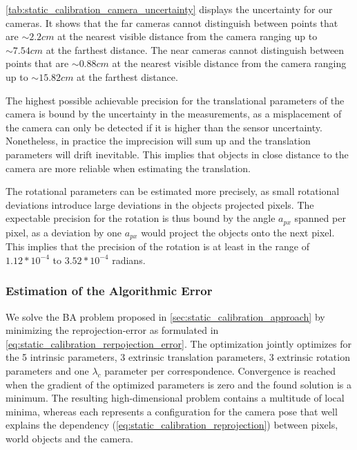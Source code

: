 \autoref{tab:static_calibration_camera_uncertainty} displays the uncertainty for our cameras.
It shows that the far cameras cannot distinguish between points that are $\sim 2.2 cm$ at the nearest visible distance from the camera ranging up to $\sim 7.54 cm$ at the farthest distance.
The near cameras cannot distinguish between points that are $\sim 0.88 cm$ at the nearest visible distance from the camera ranging up to $\sim 15.82 cm$ at the farthest distance.

The highest possible achievable precision for the translational parameters of the camera is bound by the uncertainty in the measurements, as a misplacement of the camera can only be detected if it is higher than the sensor uncertainty.
Nonetheless, in practice the imprecision will sum up and the translation parameters will drift inevitable. 
This implies that objects in close distance to the camera are more reliable when estimating the translation.

The rotational parameters can be estimated more precisely, as small rotational deviations introduce large deviations in the objects projected pixels.
The expectable precision for the rotation is thus bound by the angle $a_{px}$ spanned per pixel, as a deviation by one $a_{px}$ would project the objects onto the next pixel.
This implies that the precision of the rotation is at least in the range of $1.12 * 10^{-4}$ to $3.52 * 10^{-4}$ radians. 


\subsubsection{Estimation of the Algorithmic Error}
We solve the BA problem proposed in \autoref{sec:static_calibration_approach} by minimizing the reprojection-error as formulated in \autoref{eq:static_calibration_rerpojection_error}.
The optimization jointly optimizes for the 5 intrinsic parameters, 3 extrinsic translation parameters, 3 extrinsic rotation parameters and one $\lambda_c$ parameter per correspondence.
Convergence is reached when the gradient of the optimized parameters is zero and the found solution is a minimum.
The resulting high-dimensional problem contains a multitude of local minima, whereas each represents a configuration for the camera pose that well explains the dependency (\autoref{eq:static_calibration_reprojection}) between pixels, world objects and the camera. 

